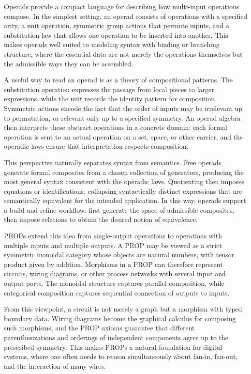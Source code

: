 Operads provide a compact language for describing how multi-input operations compose. In the simplest setting, an operad consists of operations with a specified arity, a unit operation, symmetric group actions that permute inputs, and a substitution law that allows one operation to be inserted into another. This makes operads well suited to modeling syntax with binding or branching structure, where the essential data are not merely the operations themselves but the admissible ways they can be assembled.

A useful way to read an operad is as a theory of compositional patterns. The substitution operation expresses the passage from local pieces to larger expressions, while the unit records the identity pattern for composition. Symmetric actions encode the fact that the order of inputs may be irrelevant up to permutation, or relevant only up to a specified symmetry. An operad algebra then interprets these abstract operations in a concrete domain: each formal operation is sent to an actual operation on a set, space, or other carrier, and the operadic laws ensure that interpretation respects composition.

This perspective naturally separates syntax from semantics. Free operads generate formal composites from a chosen collection of generators, producing the most general syntax consistent with the operadic laws. Quotienting then imposes equations or identifications, collapsing syntactically distinct expressions that are semantically equivalent for the intended application. In this way, operads support a build-and-refine workflow: first generate the space of admissible composites, then impose relations to obtain the desired notion of equivalence.

PROPs extend this idea from single-output operations to operations with multiple inputs and multiple outputs. A PROP may be viewed as a strict symmetric monoidal category whose objects are natural numbers, with tensor product given by addition. Morphisms in a PROP can therefore represent circuits, wiring diagrams, or other process networks with several input and output ports. The monoidal structure captures parallel composition, while categorical composition captures sequential connection of outputs to inputs.

From this viewpoint, a circuit is not merely a graph but a morphism with typed boundary data. Wiring diagrams become the graphical calculus for composing such morphisms, and the PROP axioms guarantee that different parenthesizations and orderings of independent components agree up to the prescribed symmetry. This makes PROPs a natural foundation for digital systems, where one often needs to reason simultaneously about fan-in, fan-out, and the interaction of many wires.

